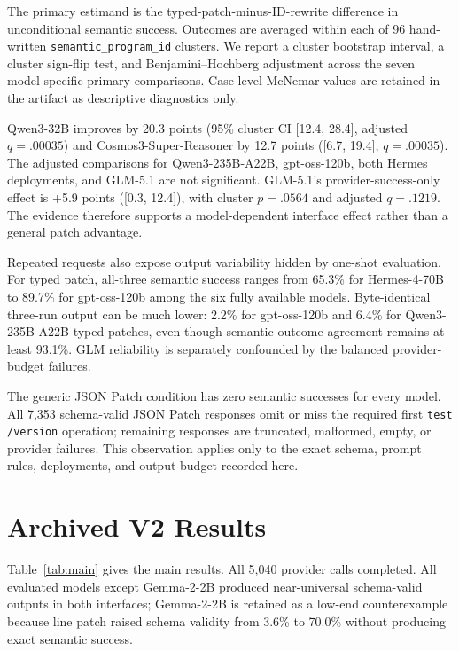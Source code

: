 \documentclass[11pt]{article}
\begin{document}
The primary estimand is the typed-patch-minus-ID-rewrite difference in
unconditional semantic success. Outcomes are averaged within each of 96
hand-written \texttt{semantic\_program\_id} clusters. We report a cluster
bootstrap interval, a cluster sign-flip test, and Benjamini--Hochberg
adjustment across the seven model-specific primary comparisons. Case-level
McNemar values are retained in the artifact as descriptive diagnostics only.

\begin{table}[H]
\centering
\scriptsize
\resizebox{\linewidth}{!}{}
\caption{Controlled v3 comparisons. Rates and effects are percentage points.
Inference clusters at the semantic-program level; BH adjustment is within each
metric and comparison family.}
\label{tab:v3-controlled}
\end{table}

Qwen3-32B improves by 20.3 points (95\% cluster CI [12.4, 28.4], adjusted
\(q=.00035\)) and Cosmos3-Super-Reasoner by 12.7 points ([6.7, 19.4],
\(q=.00035\)). The adjusted comparisons for Qwen3-235B-A22B,
gpt-oss-120b, both Hermes deployments, and GLM-5.1 are not significant.
GLM-5.1's provider-success-only effect is +5.9 points ([0.3, 12.4]), with
cluster \(p=.0564\) and adjusted \(q=.1219\). The evidence therefore supports
a model-dependent interface effect rather than a general patch advantage.

Repeated requests also expose output variability hidden by one-shot evaluation.
For typed patch, all-three semantic success ranges from 65.3\% for Hermes-4-70B
to 89.7\% for gpt-oss-120b among the six fully available models. Byte-identical
three-run output can be much lower: 2.2\% for gpt-oss-120b and 6.4\% for
Qwen3-235B-A22B typed patches, even though semantic-outcome agreement remains
at least 93.1\%. GLM reliability is separately confounded by the balanced
provider-budget failures.

The generic JSON Patch condition has zero semantic successes for every model.
All 7,353 schema-valid JSON Patch responses omit or miss the required first
\texttt{test /version} operation; remaining responses are truncated, malformed,
empty, or provider failures. This observation applies only to the exact schema,
prompt rules, deployments, and output budget recorded here.

\section{Archived V2 Results}
Table~\ref{tab:main} gives the main results. All 5,040 provider calls
completed. All evaluated models except Gemma-2-2B produced near-universal
schema-valid outputs in both interfaces; Gemma-2-2B is retained as a low-end
counterexample because line patch raised schema validity from 3.6\% to 70.0\%
without producing exact semantic success.
\end{document}
